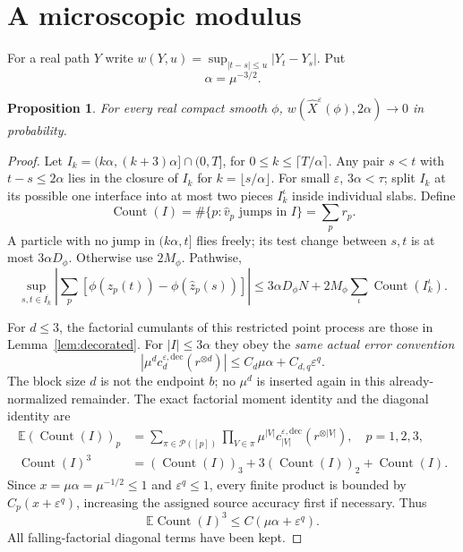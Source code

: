 \documentclass[11pt]{article}
\newcommand{\E}{\mathbb E}
\newcommand{\eps}{\varepsilon}
\newcommand{\calP}{\mathcal P}
\newcommand{\Count}{\operatorname{Count}}
\newtheorem{proposition}[theorem]{Proposition}
\theoremstyle{definition}\newtheorem{definition}[theorem]{Definition}
\theoremstyle{remark}\newtheorem{remark}[theorem]{Remark}
\numberwithin{equation}{section}
\begin{document}
\section{A microscopic modulus}\label{sec:micro}
For a real path $Y$ write
$w(Y,u)=\sup_{|t-s|\le u}|Y_t-Y_s|$. Put
\begin{equation}\label{eq:alpha}
 \alpha=\mu^{-3/2}.
\end{equation}
\begin{proposition}\label{prop:micro}
For every real compact smooth $\phi$,
$w(\widehat X^\eps(\phi),2\alpha)\to0$ in probability.
\end{proposition}
\begin{proof}
Let $I_k=(k\alpha,(k+3)\alpha]\cap(0,T]$, for
$0\le k\le\lceil T/\alpha\rceil$. Any pair $s<t$ with $t-s\le2\alpha$
lies in the closure of $I_k$ for $k=\lfloor s/\alpha\rfloor$.
For small $\eps$, $3\alpha<\tau$; split $I_k$ at its possible one interface
into at most two pieces $I_k^\iota$ inside individual slabs. Define
\[
 \Count(I)=\#\{p:\hat v_p\text{ jumps in }I\}=\sum_p r_p.
\]
A particle with no jump in $(k\alpha,t]$ flies freely; its test change
between $s,t$ is at most $3\alpha D_\phi$. Otherwise use $2M_\phi$.
Pathwise,
\begin{equation}\label{eq:micro-path}
 \sup_{s,t\in\overline{I_k}}\left|\sum_p
          [\phi(\hat z_p(t))-\phi(\hat z_p(s))]\right|
   \le3\alpha D_\phi N+2M_\phi\sum_\iota\Count(I_k^\iota).
\end{equation}

For $d\le3$, the factorial cumulants of this restricted point process are
those in Lemma~\ref{lem:decorated}. For $|I|\le3\alpha$ they obey the
\emph{same actual error convention}
\[
 |\mu^d c_{d}^{\eps,\mathrm{dec}}(r^{\otimes d})|
       \le C_d\mu\alpha+C_{d,q}\eps^q.
\]
The block size $d$ is not the endpoint $b$; no $\mu^d$ is inserted again
in this already-normalized remainder. The exact factorial moment identity
and the diagonal identity are
\begin{align}
 \E(\Count(I))_p
  &=\sum_{\pi\in\calP([p])}\prod_{V\in\pi}
             \mu^{|V|}c_{|V|}^{\eps,\mathrm{dec}}(r^{\otimes|V|}),
                      \quad p=1,2,3,\label{eq:count-partition}\\
 \Count(I)^3&=(\Count(I))_3+3(\Count(I))_2+\Count(I).
       \label{eq:count-diagonals}
\end{align}
Since $x=\mu\alpha=\mu^{-1/2}\le1$ and $\eps^q\le1$, every finite product
is bounded by $C_p(x+\eps^q)$, increasing the assigned source accuracy first
if necessary. Thus
\begin{equation}\label{eq:count-third}
 \E\Count(I)^3\le C(\mu\alpha+\eps^q).
\end{equation}
All falling-factorial diagonal terms have been kept.


\end{proof}
\end{document}
